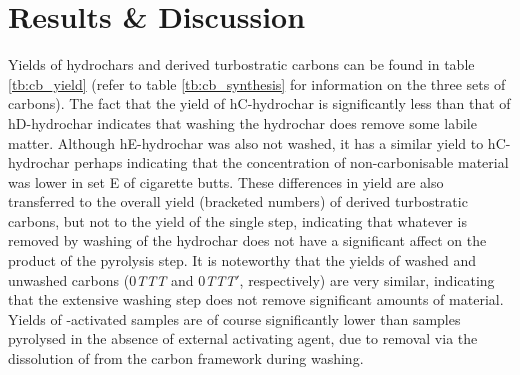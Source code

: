 \section{Results \& Discussion}
\label{s:cb_results}

Yields of hydrochars and derived turbostratic carbons can be found in table \ref{tb:cb_yield} (refer to table \ref{tb:cb_synthesis} for information on the three sets of carbons). The fact that the yield of hC-hydrochar is significantly less than that of hD-hydrochar indicates that washing the hydrochar does remove some labile matter. Although hE-hydrochar was also not washed, it has a similar yield to hC-hydrochar perhaps indicating that the concentration of non-carbonisable material was lower in set E of cigarette butts. These differences in yield are also transferred to the overall yield (bracketed numbers) of derived turbostratic carbons, but not to the yield of the single step, indicating that whatever is removed by washing of the hydrochar does not have a significant affect on the product of the pyrolysis step. It is noteworthy that the yields of washed and unwashed carbons (0\textit{TTT} and 0\textit{TTT}$'$, respectively) are very similar, indicating that the extensive washing step does not remove significant amounts of material. Yields of -activated samples are of course significantly lower than samples pyrolysed in the absence of external activating agent, due to removal  via the dissolution of  from the carbon framework during washing.

